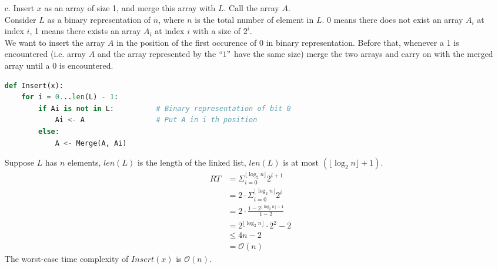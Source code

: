 \documentclass[10pt]{article}
\begin{document}
\begin{itemize}
\item[c.]Insert $x$ as an array of size 1, and merge this array with $L$. Call the array $A$.\\
Consider $L$ as a binary representation of $n$, where $n$ is the total number of element in $L$. 0 means there does not exist an array $A_i$ at index $i$, 1 means there exists an array $A_i$ at index $i$ with a size of $2^i$.\\
We want to insert the array $A$ in the position of the first occurence of 0 in binary representation. Before that, whenever a 1 is encountered (i.e. array $A$ and the array represented by the $``1"$ have the same size) merge the two arrays and carry on with the merged array until a 0 is encountered.
\begin{lstlisting}[language=Python]
def Insert(x):
	for i = 0...len(L) - 1:
		if Ai is not in L:			# Binary representation of bit 0
			Ai <- A					# Put A in i th position
		else:
			A <- Merge(A, Ai)
\end{lstlisting}
Suppose $L$ has $n$ elements, $len(L)$ is the length of the linked list, $len(L)$ is at most $(\lfloor\log_2n\rfloor + 1)$.
\begin{align*}
RT &= \Sigma^{\lfloor\log_2n\rfloor}_{i=0}2^{i+1}\\
&=2\cdot\Sigma^{\lfloor\log_2n\rfloor}_{i=0}2^i\\
&=2\cdot\frac{1-2^{\lfloor\log_2n\rfloor+1}}{1-2}\\
&=2^{\lfloor\log_2n\rfloor}\cdot2^2-2\\
&\leq 4n-2\\
&=\mathcal{O}(n)
\end{align*}
The worst-case time complexity of $Insert(x)$ is $\mathcal{O}(n)$.


\end{itemize}
\end{document}
